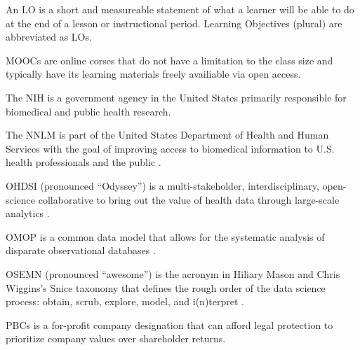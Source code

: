 \documentclass[../main.tex]{subfiles}
\begin{document}
  An LO is a short and measureable statement of what a learner will be able to do at the end of a lesson or instructional period.
  Learning Objectives (plural) are abbreviated as LOs.



  MOOCs are online corses that do not have a limitation to the class size and typically have its learning materials freely availiable via open access.



  The NIH is a government agency in the United States primarily responsible for biomedical and public health research.



  The NNLM is part of the United States Department of Health and Human Services
  with the goal of improving access to biomedical information to U.S. health professionals and the public
  \cite{nationallibraryofmedicineUsNNLM}.



  OHDSI (pronounced ``Odyssey'') is a multi-stakeholder, interdisciplinary, open-science collaborative
  to bring out the value of health data through large-scale analytics
  \cite{observationalhealthdatasciencesandinformaticsOHDSIObservationalHealth}.



  OMOP is a common data model that allows for the systematic analysis of disparate observational databases
  \cite{observationalhealthdatasciencesandinformaticsohdsiobservationalhealthOMOPCommonData}.



  OSEMN (pronounced ``awesome'') is the acronym in Hiliary Mason and Chris Wiggins's Snice taxonomy that defines
  the rough order of the data science process:
  obtain, scrub, explore, model, and i(n)terpret
  \cite{masonTaxonomyDataScience2010}.



  PBCs is a for-profit company designation that can afford legal protection
  to prioritize company values over shareholder returns.

\end{document}
